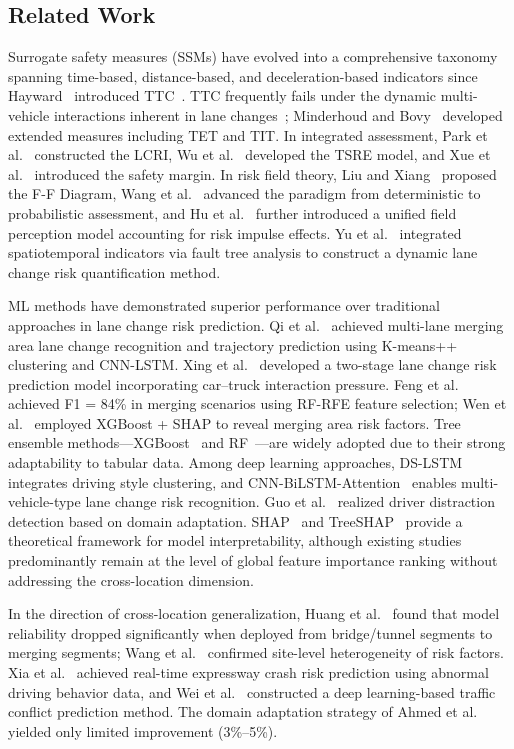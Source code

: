 \documentclass[preprint,review,12pt,a4paper]{elsarticle}
\begin{document}
\subsection{Related Work}

Surrogate safety measures (SSMs) have evolved into a comprehensive taxonomy spanning time-based, distance-based, and deceleration-based indicators since Hayward~\cite{C05} introduced TTC~\cite{C18}. TTC frequently fails under the dynamic multi-vehicle interactions inherent in lane changes~\cite{C01}; Minderhoud and Bovy~\cite{C06} developed extended measures including TET and TIT. In integrated assessment, Park et al.~\cite{C08} constructed the LCRI, Wu et al.~\cite{C03} developed the TSRE model, and Xue et al.~\cite{C02} introduced the safety margin. In risk field theory, Liu and Xiang~\cite{C01} proposed the F-F Diagram, Wang et al.~\cite{C07} advanced the paradigm from deterministic to probabilistic assessment, and Hu et al.~\cite{C29} further introduced a unified field perception model accounting for risk impulse effects. Yu et al.~\cite{C26} integrated spatiotemporal indicators via fault tree analysis to construct a dynamic lane change risk quantification method.

ML methods have demonstrated superior performance over traditional approaches in lane change risk prediction. Qi et al.~\cite{C30} achieved multi-lane merging area lane change recognition and trajectory prediction using K-means++ clustering and CNN-LSTM. Xing et al.~\cite{C31} developed a two-stage lane change risk prediction model incorporating car--truck interaction pressure. Feng et al.~\cite{C09} achieved F1 = 84\% in merging scenarios using RF-RFE feature selection; Wen et al.~\cite{C10} employed XGBoost + SHAP to reveal merging area risk factors. Tree ensemble methods---XGBoost~\cite{C19} and RF~\cite{C20}---are widely adopted due to their strong adaptability to tabular data. Among deep learning approaches, DS-LSTM~\cite{C11} integrates driving style clustering, and CNN-BiLSTM-Attention~\cite{C12} enables multi-vehicle-type lane change risk recognition. Guo et al.~\cite{C28} realized driver distraction detection based on domain adaptation. SHAP~\cite{C13} and TreeSHAP~\cite{C14} provide a theoretical framework for model interpretability, although existing studies predominantly remain at the level of global feature importance ranking without addressing the cross-location dimension.

In the direction of cross-location generalization, Huang et al.~\cite{C22} found that model reliability dropped significantly when deployed from bridge/tunnel segments to merging segments; Wang et al.~\cite{C16} confirmed site-level heterogeneity of risk factors. Xia et al.~\cite{C32} achieved real-time expressway crash risk prediction using abnormal driving behavior data, and Wei et al.~\cite{C34} constructed a deep learning-based traffic conflict prediction method. The domain adaptation strategy of Ahmed et al.~\cite{C23} yielded only limited improvement (3\%--5\%).
\end{document}
